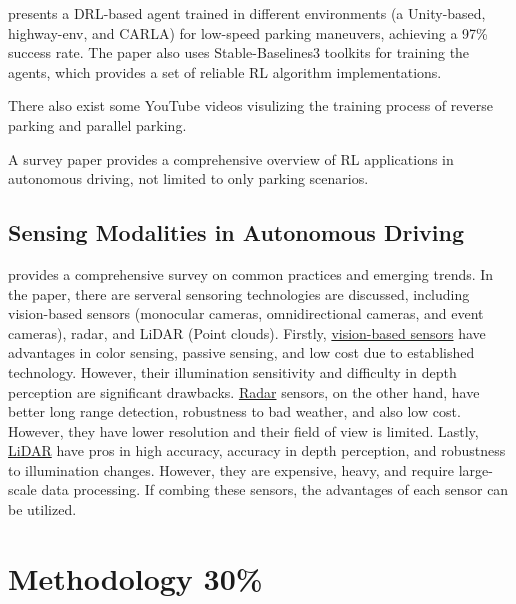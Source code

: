 \documentclass{article}
\begin{document}
\citet{lazzaroni2023automated} presents a DRL-based agent trained in different environments (a Unity-based, highway-env, and CARLA) for low-speed parking maneuvers, achieving a 97\% success rate. The paper also uses Stable-Baselines3 \cite{stable-baselines3} toolkits for training the agents, which provides a set of reliable RL algorithm implementations.

There also exist some YouTube videos \citep{youtube2019,youtube2022} visulizing the training process of reverse parking and parallel parking.

A survey paper \cite{elallid2022comprehensive} provides a comprehensive overview of RL applications in autonomous driving, not limited to only parking scenarios.

\subsection{Sensing Modalities in Autonomous Driving}

\citet{yurtsever2020survey} provides a comprehensive survey on common practices and emerging trends. In the paper, there are serveral sensoring technologies are discussed, including vision-based sensors (monocular cameras, omnidirectional cameras, and event cameras), radar, and LiDAR (Point clouds). Firstly, \underline{vision-based sensors} have advantages in color sensing, passive sensing, and low cost due to established technology. However, their illumination sensitivity and difficulty in depth perception are significant drawbacks. \underline{Radar} sensors, on the other hand, have better long range detection, robustness to bad weather, and also low cost. However, they have lower resolution and their field of view is limited. Lastly, \underline{LiDAR} have pros in high accuracy, accuracy in depth perception, and robustness to illumination changes. However, they are expensive, heavy, and require large-scale data processing. If combing these sensors, the advantages of each sensor can be utilized.













\newpage

\section{Methodology 30\%}\label{sec:methodology}
\end{document}
